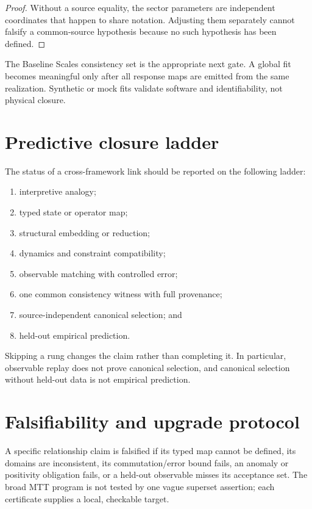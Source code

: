\documentclass[11pt]{article}
\begin{document}
\begin{proof}
Without a source equality, the sector parameters are independent coordinates
that happen to share notation. Adjusting them separately cannot falsify a
common-source hypothesis because no such hypothesis has been defined.
\end{proof}

The Baseline Scales consistency set is the appropriate next gate. A global fit
becomes meaningful only after all response maps are emitted from the same
realization. Synthetic or mock fits validate software and identifiability, not
physical closure.

\section{Predictive closure ladder}

The status of a cross-framework link should be reported on the following
ladder:
\begin{enumerate}
\item interpretive analogy;
\item typed state or operator map;
\item structural embedding or reduction;
\item dynamics and constraint compatibility;
\item observable matching with controlled error;
\item one common consistency witness with full provenance;
\item source-independent canonical selection; and
\item held-out empirical prediction.
\end{enumerate}

Skipping a rung changes the claim rather than completing it. In particular,
observable replay does not prove canonical selection, and canonical selection
without held-out data is not empirical prediction.

\section{Falsifiability and upgrade protocol}

A specific relationship claim is falsified if its typed map cannot be defined,
its domains are inconsistent, its commutation/error bound fails, an anomaly or
positivity obligation fails, or a held-out observable misses its acceptance
set. The broad MTT program is not tested by one vague superset assertion; each
certificate supplies a local, checkable target.
\end{document}
